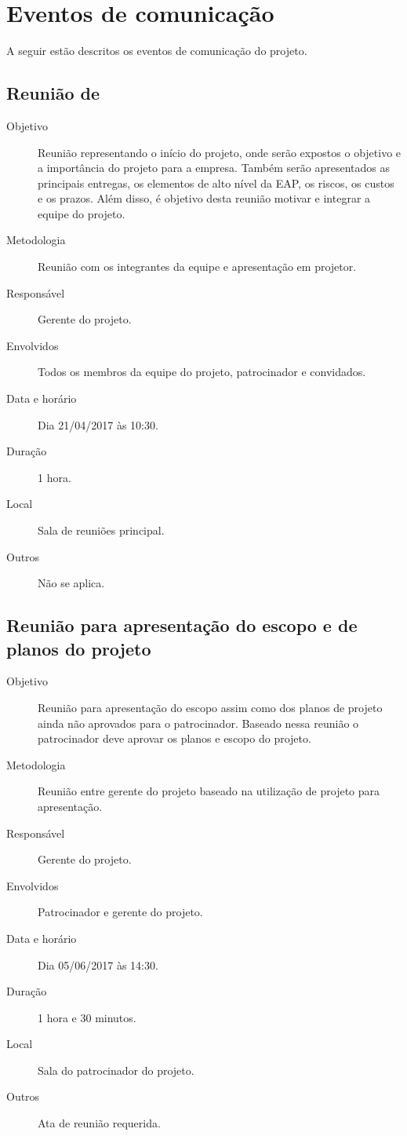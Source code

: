 \section{Eventos de comunicação}

A seguir estão descritos os eventos de comunicação do projeto.

\subsection{Reunião de }

\begin{description}
	\item[Objetivo] Reunião representando o início do projeto, onde serão expostos o objetivo e a importância do projeto para a empresa. Também serão apresentados as principais entregas, os elementos de alto nível da EAP, os riscos, os custos e os prazos. Além disso, é objetivo desta reunião motivar e integrar a equipe do projeto. 
	\item[Metodologia] Reunião com os integrantes da equipe e apresentação em projetor.
	\item[Responsável] Gerente do projeto.
	\item[Envolvidos] Todos os membros da equipe do projeto, patrocinador e convidados.
	\item[Data e horário] Dia 21/04/2017 às 10:30.
	\item[Duração] 1 hora.
	\item[Local] Sala de reuniões principal.
	\item[Outros] Não se aplica.
\end{description}

\subsection{Reunião para apresentação do escopo e de planos do projeto}

\begin{description}
	\item[Objetivo] Reunião para apresentação do escopo assim como dos planos de projeto ainda não aprovados para o patrocinador. Baseado nessa reunião o patrocinador deve aprovar os planos e escopo do projeto.
	\item[Metodologia] Reunião entre gerente do projeto baseado na utilização de projeto para apresentação.
	\item[Responsável] Gerente do projeto.
	\item[Envolvidos] Patrocinador e gerente do projeto.
	\item[Data e horário] Dia 05/06/2017 às 14:30.
	\item[Duração] 1 hora e 30 minutos.
	\item[Local] Sala do patrocinador do projeto.
	\item[Outros] Ata de reunião requerida.
\end{description}

